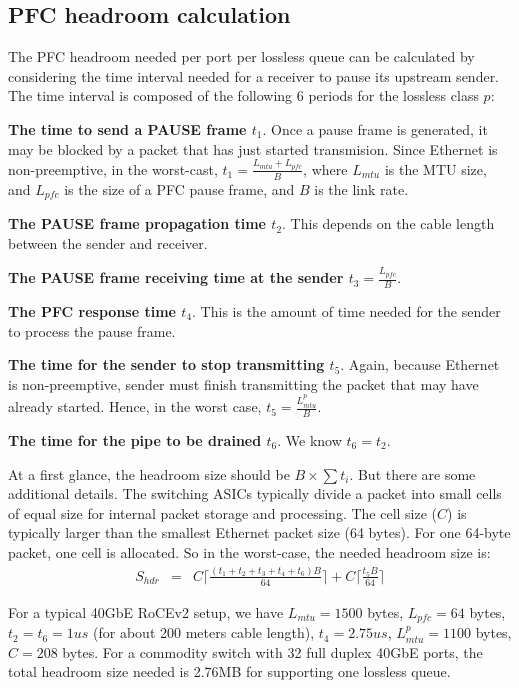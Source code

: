 \begin{appendices}
\section{PFC headroom calculation}\label{APPHEADROOM}

The PFC headroom needed per port per lossless queue can be calculated by
		considering the time interval needed for a receiver to pause its
		upstream sender. The time interval is composed of the following 6
		periods for the lossless class $p$:

	
\noindent\textbf{The time to send a PAUSE frame $t_1$}.  Once a pause frame is
		generated, it may be blocked by a packet that has just started
		transmision. Since Ethernet is non-preemptive, in the worst-cast,
		$t_1 = \frac{ L_{mtu} + L_{pfc}}{B}$, where $L_{mtu}$ is the MTU size,
		and $L_{pfc}$ is the size of a PFC pause frame, and $B$ is the link
		rate.

\noindent\textbf{The PAUSE frame propagation time $t_2$}. This depends on 
		the cable length between the sender and receiver.

\noindent\textbf{The PAUSE frame receiving time at the sender $t_3=\frac{L_{pfc}}{B}$}.

\noindent\textbf{The PFC response time $t_4$}. This is the amount of time needed
		for the sender to process the pause frame.

\noindent\textbf{The time for the sender to stop transmitting $t_5$}. Again,
		because Ethernet is non-preemptive, sender must finish 
		transmitting the packet that may have already started. Hence, in the
		worst case, $t_5 =
		\frac{L^{p}_{mtu}}{B}$.

\noindent\textbf{The time for the pipe to be drained $t_6$}. We know $t_6 =
		t_2$.


At a first glance, the headroom size should be $B\times\sum t_i$. But there are
some additional details. The switching ASICs typically divide a packet
into small cells of equal size for internal packet storage and
processing. The cell size ($C$) is typically larger than the smallest
Ethernet packet size (64 bytes). For one 64-byte packet, one cell is
allocated. So in the worst-case, the needed headroom size is:
\begin{eqnarray} \label{eqn:pfcheadroom} S_{hdr} & = &
C\lceil\frac{(t_1+t_2+t_3+t_4 + t_6)B}{64}\rceil + C\lceil \frac{t_5
B}{64}\rceil \nonumber \end{eqnarray}

For a typical 40GbE RoCEv2 setup, we have $L_{mtu}=1500$ bytes, $L_{pfc}=64$
bytes, $t_2=t_6=1us$ (for about 200 meters cable length), $t_4=2.75us$,
$L^{p}_{mtu}=1100$ bytes, $C=208$ bytes.  For a commodity switch with 32
full duplex 40GbE ports, the total headroom size needed is 2.76MB for
supporting one lossless queue.  


\end{appendices}
